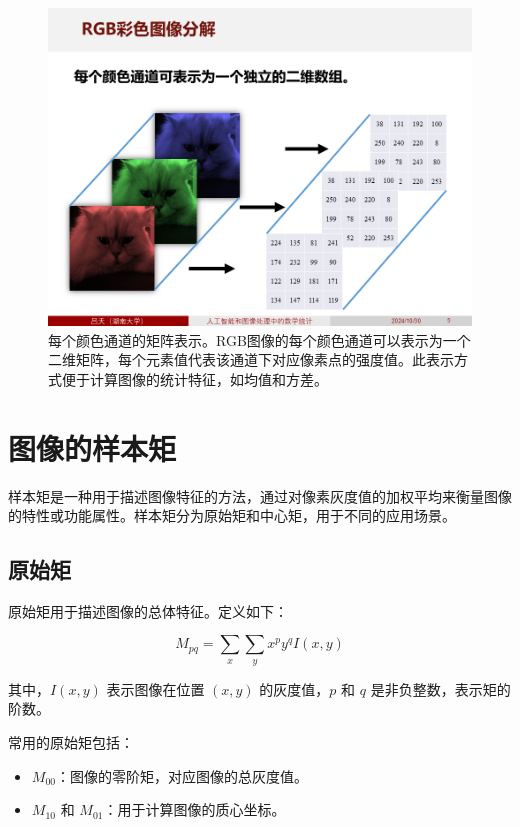 \documentclass[
    report,     %
    oneside,    %
    UTF8,       %
    zihao=-4    %
]{config} %
\begin{document}
\begin{figure}[H] %
    \centering %
    \includegraphics[width=\linewidth]{figures/图像数据的处理方式/3.PNG}
    \caption[每个颜色通道的矩阵表示]{每个颜色通道的矩阵表示。RGB图像的每个颜色通道可以表示为一个二维矩阵，每个元素值代表该通道下对应像素点的强度值。此表示方式便于计算图像的统计特征，如均值和方差。}
\end{figure}
\vspace{-0.7em}

\section{图像的样本矩}

样本矩是一种用于描述图像特征的方法，通过对像素灰度值的加权平均来衡量图像的特性或功能属性。样本矩分为原始矩和中心矩，用于不同的应用场景。

\subsection{原始矩}

原始矩用于描述图像的总体特征。定义如下：

\begin{equation}
M_{pq} = \sum_x \sum_y x^p y^q I(x, y)
\end{equation}

其中，\( I(x, y) \) 表示图像在位置 \( (x, y) \) 的灰度值，\( p \) 和 \( q \) 是非负整数，表示矩的阶数。

常用的原始矩包括：
\begin{itemize}
    \item \( M_{00} \)：图像的零阶矩，对应图像的总灰度值。
    \item \( M_{10} \) 和 \( M_{01} \)：用于计算图像的质心坐标。
\end{itemize}
\end{document}

